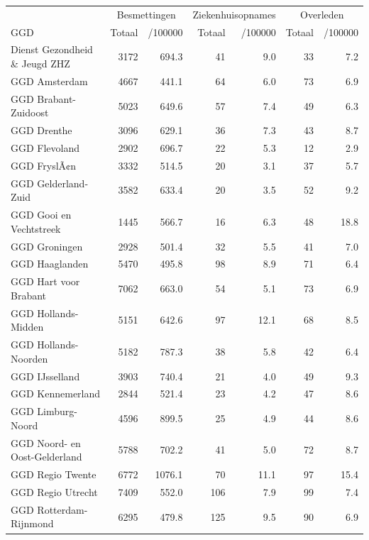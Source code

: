 \documentclass[
  english,
  man,floatsintext]{apa6}
\begin{document}
\begin{table}[H]
\centering\begingroup\fontsize{10}{12}\selectfont

\begin{threeparttable}
\begin{tabular}{lrrrrrr}
\toprule
\multicolumn{1}{c}{ } & \multicolumn{2}{c}{Besmettingen} & \multicolumn{2}{c}{Ziekenhuisopnames} & \multicolumn{2}{c}{Overleden} \\
\cmidrule(l{3pt}r{3pt}){2-3} \cmidrule(l{3pt}r{3pt}){4-5} \cmidrule(l{3pt}r{3pt}){6-7}
GGD & Totaal & /100000 & Totaal & /100000 & Totaal & /100000\\
\midrule
Dienst Gezondheid \& Jeugd ZHZ & 3172 & 694.3 & 41 & 9.0 & 33 & 7.2\\
GGD Amsterdam & 4667 & 441.1 & 64 & 6.0 & 73 & 6.9\\
GGD Brabant-Zuidoost & 5023 & 649.6 & 57 & 7.4 & 49 & 6.3\\
GGD Drenthe & 3096 & 629.1 & 36 & 7.3 & 43 & 8.7\\
GGD Flevoland & 2902 & 696.7 & 22 & 5.3 & 12 & 2.9\\
GGD FryslÃ¢n & 3332 & 514.5 & 20 & 3.1 & 37 & 5.7\\
GGD Gelderland-Zuid & 3582 & 633.4 & 20 & 3.5 & 52 & 9.2\\
GGD Gooi en Vechtstreek & 1445 & 566.7 & 16 & 6.3 & 48 & 18.8\\
GGD Groningen & 2928 & 501.4 & 32 & 5.5 & 41 & 7.0\\
GGD Haaglanden & 5470 & 495.8 & 98 & 8.9 & 71 & 6.4\\
GGD Hart voor Brabant & 7062 & 663.0 & 54 & 5.1 & 73 & 6.9\\
GGD Hollands-Midden & 5151 & 642.6 & 97 & 12.1 & 68 & 8.5\\
GGD Hollands-Noorden & 5182 & 787.3 & 38 & 5.8 & 42 & 6.4\\
GGD IJsselland & 3903 & 740.4 & 21 & 4.0 & 49 & 9.3\\
GGD Kennemerland & 2844 & 521.4 & 23 & 4.2 & 47 & 8.6\\
GGD Limburg-Noord & 4596 & 899.5 & 25 & 4.9 & 44 & 8.6\\
GGD Noord- en Oost-Gelderland & 5788 & 702.2 & 41 & 5.0 & 72 & 8.7\\
GGD Regio Twente & 6772 & 1076.1 & 70 & 11.1 & 97 & 15.4\\
GGD Regio Utrecht & 7409 & 552.0 & 106 & 7.9 & 99 & 7.4\\
GGD Rotterdam-Rijnmond & 6295 & 479.8 & 125 & 9.5 & 90 & 6.9\\

\end{tabular}
\end{threeparttable}
\end{table}
\end{document}
